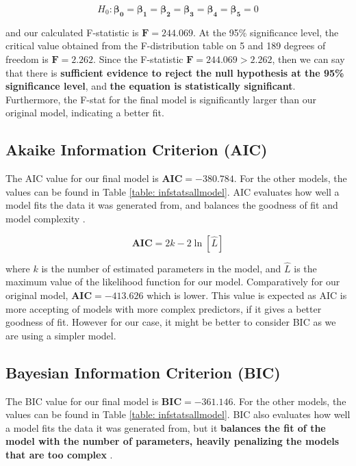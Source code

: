 \documentclass{article}
\begin{document}
\begin{equation}
    H_0: \bm{\beta_0} = \bm{\beta_1} = \bm{\beta_2} = \bm{\beta_3} = \bm{\beta_4} = \bm{\beta_5} = 0
\end{equation}

\noindent and our calculated F-statistic is $\bm{F = 244.069}$. At the 95\% significance level, the critical value obtained from the F-distribution table on 5 and 189 degrees of freedom is $\bm{F = 2.262}$. Since the F-statistic $\bm{F = 244.069 > 2.262}$, then we can say that there is \textbf{sufficient evidence to reject the null hypothesis at the 95\% significance level}, and \textbf{the equation is statistically significant}. Furthermore, the F-stat for the final model is significantly larger than our original model, indicating a better fit.

\subsection{Akaike Information Criterion (AIC)}
The AIC value for our final model is $\textbf{AIC} \bm{= -380.784}$. For the other models, the values can be found in Table \ref{table: infstatsallmodel}. AIC evaluates how well a model fits the data it was generated from, and balances the goodness of fit and model complexity \cite{AICBIC}. 

\begin{equation}
    \textbf{AIC} = 2k - 2\ln{[\hat{L}]}
\end{equation}

\noindent where $k$ is the number of estimated parameters in the model, and $\hat{L}$ is the maximum value of the likelihood function for our model. Comparatively for our original model, $\textbf{AIC} \bm{= -413.626}$ which is lower. This value is expected as AIC is more accepting of models with more complex predictors, if it gives a better goodness of fit. However for our case, it might be better to consider BIC as we are using a simpler model.

\subsection{Bayesian Information Criterion (BIC)}
The BIC value for our final model is $\textbf{BIC} \bm{= -361.146}$. For the other models, the values can be found in Table \ref{table: infstatsallmodel}. BIC also evaluates how well a model fits the data it was generated from, but it \textbf{balances the fit of the model with the number of parameters, heavily penalizing the models that are too complex} \cite{AICBIC}.
\end{document}

